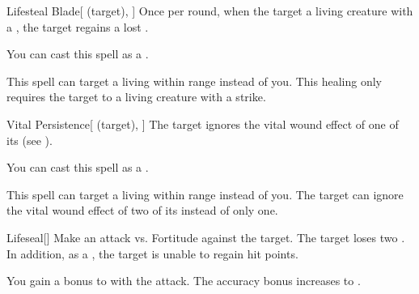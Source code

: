 \lowercase{\hypertarget{spell:Lifesteal Blade}{}}\label{spell:Lifesteal Blade}
\begin{attuneability}[Rank 3]{\hypertarget{spell:Lifesteal Blade}{Lifesteal Blade}}[ (target), ]
Once per round, when the target  a living creature with a , the target regains a lost .

You can cast this spell as a .

\rankline
{} This spell can target a living  within \rngmed range instead of you.
 This healing only requires the target to  a living creature with a strike.

\end{attuneability}
\vspace{0.25em}



\lowercase{\hypertarget{spell:Vital Persistence}{}}\label{spell:Vital Persistence}
\begin{attuneability}[Rank 3]{\hypertarget{spell:Vital Persistence}{Vital Persistence}}[ (target), ]
The target ignores the vital wound effect of one of its  (see ).

You can cast this spell as a .

\rankline
{} This spell can target a living  within \rngmed range instead of you.
 The target can ignore the vital wound effect of two of its  instead of only one.

\end{attuneability}
\vspace{0.25em}



\lowercase{\hypertarget{spell:Lifeseal}{}}\label{spell:Lifeseal}
\begin{freeability}[Rank 4]{\hypertarget{spell:Lifeseal}{Lifeseal}}[]
Make an attack vs. Fortitude against the target.
\hit The target loses two .
In addition, as a , the target is unable to regain hit points.

\rankline
{} You gain a  bonus to  with the attack.
 The accuracy bonus increases to .

\end{freeability}
\vspace{0.25em}



